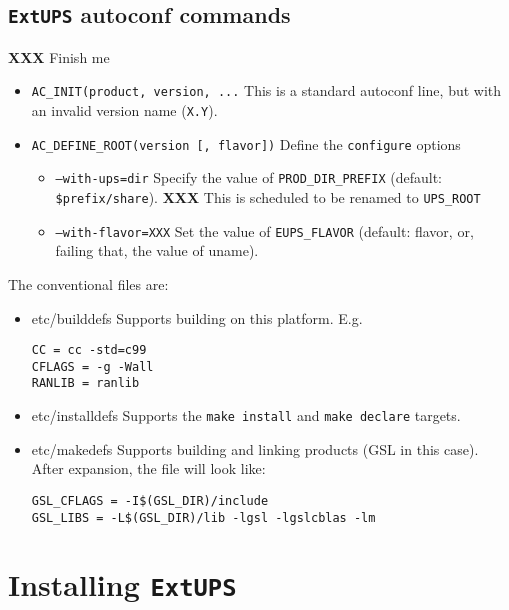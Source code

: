 \documentclass{article}
\newcommand{\XXX}[1]{\textbf{XXX} #1}
\newcommand{\code}[1]{\texttt{#1}}
\newcommand{\eups}{\code{ExtUPS}}
\begin{document}
\subsection{\eups{} autoconf commands}
\label{autoconfReference}

\XXX{Finish me}

\begin{itemize}
  \item{\texttt{AC\_INIT(product, version, ...}}
    This is a standard autoconf line, but with an invalid version name (\texttt{X.Y}).

  \item{\texttt{AC\_DEFINE\_ROOT(version [, flavor])}}
    Define the \texttt{configure} options
    \begin{itemize}
      \item{\texttt{--with-ups=dir}}
        Specify the value of \texttt{PROD\_DIR\_PREFIX}
        (default: \texttt{\$prefix/share}).
        \XXX{This is scheduled to be renamed to \texttt{UPS\_ROOT}}
      \item{\texttt{--with-flavor=XXX}}
        Set the value of \texttt{EUPS\_FLAVOR}
        (default: flavor, or, failing that, the value of uname).
    \end{itemize}
\end{itemize}

The conventional files are:
\begin{itemize}
   \item{etc/builddefs}
     Supports building on this platform. E.g.
\begin{verbatim}
CC = cc -std=c99
CFLAGS = -g -Wall
RANLIB = ranlib
\end{verbatim}
  
   \item{etc/installdefs}
     Supports the \texttt{make install} and \texttt{make declare} targets.
  
   \item{etc/makedefs}
     Supports building and linking products (GSL in this case). After
     expansion, the file will look like:
\begin{verbatim}
GSL_CFLAGS = -I$(GSL_DIR)/include
GSL_LIBS = -L$(GSL_DIR)/lib -lgsl -lgslcblas -lm
\end{verbatim}
\end{itemize}
  
\section{Installing \eups{}}
  
\end{document}
